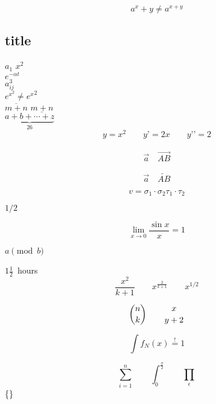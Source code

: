 \documentclass[UTF8]{ctexart}
\begin{document}
\begin{equation}
a^x+y \neq a^{x+y}
\end{equation}

\subsection{title}
$a_{1}$ \qquad $x^{2}$ \qquad\\[15pt]
$e^{-\alpha t}$ \qquad\\[15pt]
$a^{3}_{ij}$\\[15pt]
$e^{x^2} \neq {e^x}^2$\\[15pt]
$\overline{m+n}$ \qquad
$\underline{m+n}$\\[15pt]
$\underbrace{ a+b+\cdots+z }_{26}$\\[15pt]
\begin{displaymath}
y=x^{2}\qquad y’=2x\qquad y’’=2
\end{displaymath}\\[15pt]
\begin{displaymath}
\vec a\quad\overrightarrow{AB}
\end{displaymath}\\[15pt]

\begin{displaymath}
\vec a\quad\overleftarrow{AB}
\end{displaymath} 

\begin{displaymath}
v = {\sigma}_1 \cdot {\sigma}_2
{\tau}_1 \cdot {\tau}_2
\end{displaymath}

$1/2$


\[\lim_{x \rightarrow 0}
\frac{\sin x}{x}=1\]

$a \pmod b $

$1\frac{1}{2}$~hours
\begin{displaymath}
\frac{ x^{2} }{ k+1 }\qquad
x^{ \frac{2}{k+1} }\qquad
x^{ 1/2 }
\end{displaymath}

\begin{displaymath}
{n \choose k}\qquad {x \atop y+2}
\end{displaymath}

\begin{displaymath}
\int f_N(x) \stackrel{!}{=} 1
\end{displaymath}

\begin{displaymath}
\sum_{i=1}^{n} \qquad
\int_{0}^{\frac{\pi}{2}} \qquad
\prod_\epsilon
\end{displaymath}
\{\}
\end{document}
